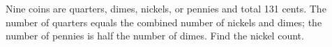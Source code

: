 Nine coins are quarters, dimes, nickels, or pennies and total 131 cents. The number of quarters equals the combined number of nickels and dimes; the number of pennies is half the number of dimes. Find the nickel count.
